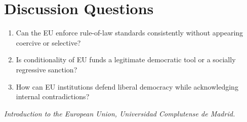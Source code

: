 \documentclass[11pt,a4paper]{article}
\begin{document}
\section*{Discussion Questions}
\begin{enumerate}
\item Can the EU enforce rule-of-law standards consistently without appearing coercive or selective?
\item Is conditionality of EU funds a legitimate democratic tool or a socially regressive sanction?
\item How can EU institutions defend liberal democracy while acknowledging internal contradictions?
\end{enumerate}

\vspace{1em}
\noindent\footnotesize\textit{Introduction to the European Union, Universidad Complutense de Madrid.}
\end{document}
